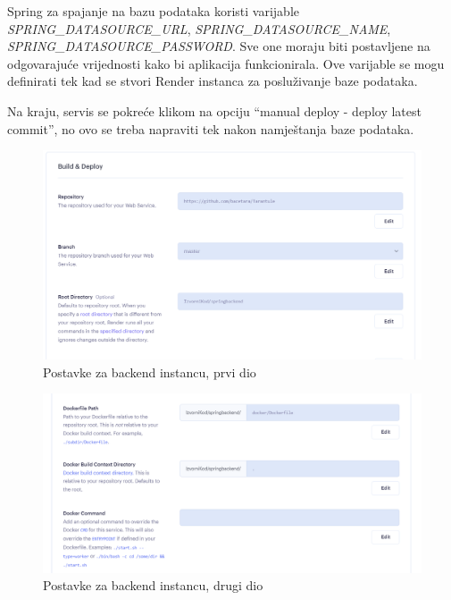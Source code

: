 			 Spring za spajanje na bazu podataka koristi varijable \textit{SPRING\_DATASOURCE\_URL}, \textit{SPRING\_DATASOURCE\_NAME}, \textit{SPRING\_DATASOURCE\_PASSWORD}. Sve one moraju biti postavljene na odgovarajuće vrijednosti kako bi aplikacija funkcionirala. Ove varijable se mogu definirati tek kad se stvori Render instanca za posluživanje baze podataka.
			 
			 Na kraju, servis se pokreće klikom na opciju “manual deploy - deploy latest commit”, no ovo se treba napraviti tek nakon namještanja baze podataka.
			 
			 \begin{figure}[H]
				\includegraphics[width=\textwidth]{slike/beDeploy1.png} %
				\caption{Postavke za backend instancu, prvi dio}
				\label{fig:beDeploy1} %
			 \end{figure}

			 \begin{figure}[H]
				\includegraphics[width=\textwidth]{slike/beDeploy2.png} %
				\caption{Postavke za backend instancu, drugi dio}
				\label{fig:beDeploy2} %
			 \end{figure}

